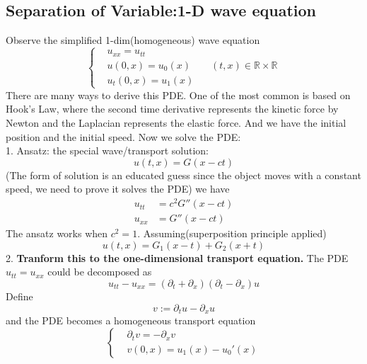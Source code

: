 \subsection{Separation of Variable:1-D wave equation}
Observe the simplified 1-dim(homogeneous) wave equation\\
\begin{equation}\label{WE}
\left\{
\begin{aligned}
	&u_{xx} = u_{tt} \\
	&u(0, x) = u_0(x) \qquad (t, x) \in \mathbb{R} \times \mathbb{R}\\
	&u_t(0, x) = u_1(x)
\end{aligned}
\right.
\end{equation}
There are many ways to derive this PDE. One of the most common is based on Hook's Law, where the second time derivative represents the kinetic force by Newton and the Laplacian represents the elastic force. And we have the initial position and the initial speed. Now we solve the PDE: \\
1. Ansatz: the special wave/transport solution:
\begin{equation*}
	u(t, x) = G(x - ct)
\end{equation*}
(The form of solution is an educated guess since the object moves with a constant speed, we need to prove it solves the PDE)
we have
\begin{align*}
	u_{tt} &= c^2 G''(x - ct)\\
	u_{xx} &= G''(x-ct)
\end{align*}
The ansatz works when $c^2 = 1$. Assuming(superposition principle applied)
\begin{equation*}
	u(t, x) = G_1(x - t) + G_2( x + t)
\end{equation*}
2. \textbf{Tranform this to the one-dimensional transport equation.} The PDE $u_{tt} = u_{xx}$ could be decomposed as
\begin{equation*}
	u_{tt} - u_{xx} = (\partial_t + \partial_x)(\partial_t - \partial_x)u 
\end{equation*}
Define
\begin{equation*}
	v:= \partial_t u - \partial_x u
\end{equation*}
and the PDE becomes a homogeneous transport equation
\begin{equation*}
\left\{
\begin{aligned}
	&\partial_t v = - \partial_x v\\
	& v(0, x) =	u_1(x) - u_0'(x)
\end{aligned} 
\right.
\end{equation*}
